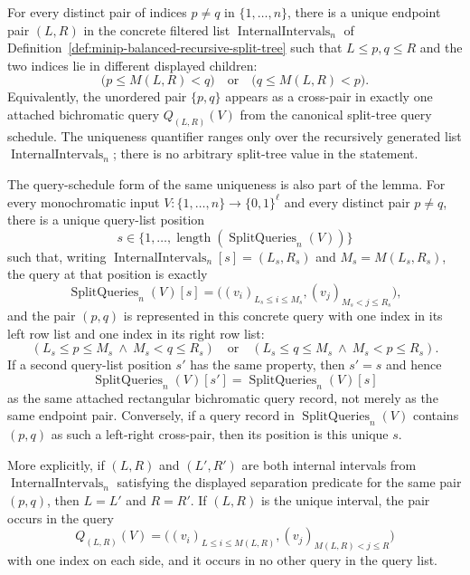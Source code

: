\begin{lemma}
  \label{lem:minip-split-tree-pair-coverage}
  For every distinct pair of indices $p\neq q$ in $\{1,\ldots,n\}$, there is a
  unique endpoint pair $(L,R)$ in the concrete filtered list
  $\operatorname{InternalIntervals}_n$ of
  Definition~\ref{def:minip-balanced-recursive-split-tree} such that
  $L\leq p,q\leq R$ and the two indices lie in different displayed children:
  \[
    \bigl(p\leq M(L,R)<q\bigr)
    \quad\text{or}\quad
    \bigl(q\leq M(L,R)<p\bigr).
  \]
  Equivalently, the unordered pair $\{p,q\}$ appears as a cross-pair in
  exactly one attached bichromatic query $Q_{(L,R)}(V)$ from the canonical
  split-tree query schedule.  The uniqueness quantifier ranges only over the
  recursively generated list $\operatorname{InternalIntervals}_n$; there is no
  arbitrary split-tree value in the statement.

  The query-schedule form of the same uniqueness is also part of the lemma.
  For every monochromatic input
  $V:\{1,\ldots,n\}\to\{0,1\}^{\ell}$ and every distinct pair $p\neq q$, there
  is a unique query-list position
  \[
    s\in\{1,\ldots,
      \operatorname{length}(\operatorname{SplitQueries}_n(V))\}
  \]
  such that, writing
  $\operatorname{InternalIntervals}_n[s]=(L_s,R_s)$ and
  $M_s=M(L_s,R_s)$, the query at that position is exactly
  \[
    \operatorname{SplitQueries}_n(V)[s]
      =
      \bigl((v_i)_{L_s\leq i\leq M_s},
            (v_j)_{M_s<j\leq R_s}\bigr),
  \]
  and the pair $(p,q)$ is represented in this concrete query with one index in
  its left row list and one index in its right row list:
  \[
    (L_s\leq p\leq M_s\ \wedge\ M_s<q\leq R_s)
    \quad\text{or}\quad
    (L_s\leq q\leq M_s\ \wedge\ M_s<p\leq R_s).
  \]
  If a second query-list position $s'$ has the same property, then
  $s'=s$ and hence
  \[
    \operatorname{SplitQueries}_n(V)[s']
      =
      \operatorname{SplitQueries}_n(V)[s]
  \]
  as the same attached rectangular bichromatic query record, not merely as the
  same endpoint pair.  Conversely, if a query record in
  $\operatorname{SplitQueries}_n(V)$ contains $(p,q)$ as such a left-right
  cross-pair, then its position is this unique $s$.

  More explicitly, if $(L,R)$ and $(L',R')$ are both internal intervals from
  $\operatorname{InternalIntervals}_n$ satisfying the displayed separation
  predicate for the same pair $(p,q)$, then $L=L'$ and $R=R'$.  If
  $(L,R)$ is the unique interval, the pair occurs in the query
  \[
    Q_{(L,R)}(V)=
    \bigl((v_i)_{L\leq i\leq M(L,R)},
          (v_j)_{M(L,R)<j\leq R}\bigr)
  \]
  with one index on each side, and it occurs in no other query in the query
  list.


\end{lemma}

